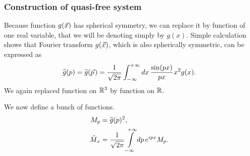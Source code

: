 \documentclass[10pt,t]{beamer}
\begin{document}
\begin{frame}
  \frametitle{Construction of quasi-free system}


  Because function $g( \vec{x} )$ has spherical symmetry, we can replace it
  by function of one real variable, that we will be denoting simply
  by $g( x )$. Simple calculation shows that Fourier transform $g( \vec{x} )$,
  which is also spherically symmetric, can be expressed as
  \begin{equation}
    \label{eq:Model-ukladu-z-dwoma-ETC-09}
    \widehat{g}( p ) = \widehat{g}( \vec{p} \hspace{0.1em} ) =
    \frac{ 1 }{ \sqrt{ 2 \pi } }
    \int_{ -\infty }^{ +\infty } dx \, \frac{ \sin( p x ) }{ p x }
    \hspace{0.07em} x^{ 2 } g( x ).
  \end{equation}
  We again replaced function on $\mathbb{R}^{ 3 }$ by function on $\mathbb{R}$.

  We now define a bunch of functions.
  \begin{align}
    \label{eq:Epstein-Glaser-24-A}
    M_{ p }
    &= \widehat{g}( p )^{ 2 }, \\
    \check{M}_{ \hspace{0.07em} x }
    &=
      \frac{ 1 }{ \sqrt{ 2 \pi } }
      \int\limits_{ -\infty }^{ +\infty } dp \, e^{ i p x } M_{ p }.
  \end{align}

\end{frame}
\end{document}
